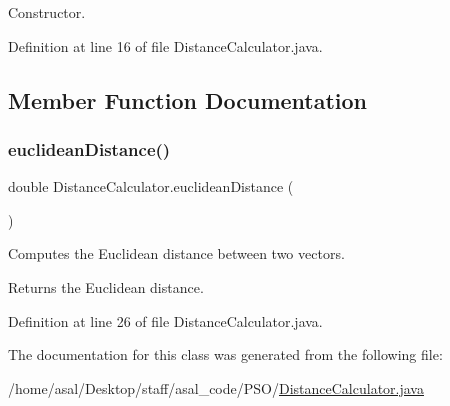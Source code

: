 Constructor. 

Definition at line 16 of file Distance\+Calculator.\+java.



\subsection{Member Function Documentation}
\mbox{\label{class_distance_calculator_a1530ee476e59d1da8e59876c16a03f55}} 
\subsubsection{\texorpdfstring{euclidean\+Distance()}{euclideanDistance()}}
{\footnotesize\ttfamily double Distance\+Calculator.\+euclidean\+Distance (\begin{DoxyParamCaption}{ }\end{DoxyParamCaption})}

Computes the Euclidean distance between two vectors. \begin{DoxyReturn}{Returns}
the Euclidean distance. 
\end{DoxyReturn}


Definition at line 26 of file Distance\+Calculator.\+java.



The documentation for this class was generated from the following file\+:\begin{DoxyCompactItemize}
\item 
/home/asal/\+Desktop/staff/asal\+\_\+code/\+P\+S\+O/\hyperlink{_distance_calculator_8java}{Distance\+Calculator.\+java}\end{DoxyCompactItemize}

